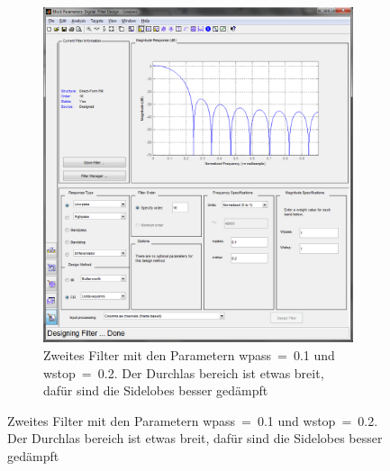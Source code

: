 \begin{figure} [h]
\begin{subfigure}[t]{0.5\textwidth}
                 \includegraphics[width=\textwidth]{common/img/filter2.png}
                 \vspace{.1cm}
                 \caption{ Zweites Filter mit den Parametern wpass~=~0.1 und wstop~=~0.2. Der Durchlas bereich ist etwas breit, dafür sind die Sidelobes besser gedämpft }
                 \label{fig:Filter2_B}
         \end{subfigure}
%
\end{figure}
